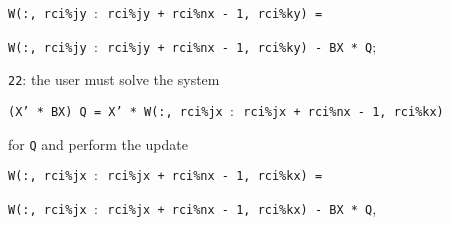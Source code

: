 \begin{description}
\begin{description}
\hspace{8mm}
{\tt W(:, rci\%jy $:$ rci\%jy + rci\%nx - 1, rci\%ky) =}

\hspace{12mm}
{\tt W(:, rci\%jy $:$ rci\%jy + rci\%nx - 1, rci\%ky) - BX * Q};
%
\item
{\tt 22}: 
the user must solve the system

\hspace{8mm}
{\tt (X' * BX) Q = 
X' * W(:, rci\%jx $:$ rci\%jx + rci\%nx - 1, rci\%kx)}

for {\tt Q}  and perform the update

\hspace{8mm}
{\tt W(:, rci\%jx $:$ rci\%jx + rci\%nx - 1, rci\%kx) =}

\hspace{12mm}
{\tt W(:, rci\%jx $:$ rci\%jx + rci\%nx - 1, rci\%kx) - BX * Q},


\end{description}
\end{description}

